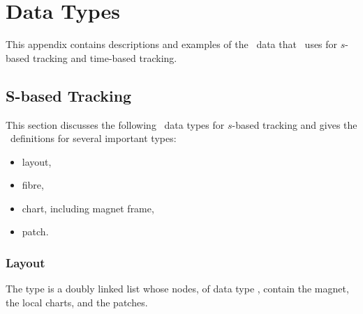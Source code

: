 \makeusother

\chapter{Data Types}

This appendix contains descriptions and examples of the \Fninety\ data that \PTC\ uses for $s$-based tracking and time-based tracking.



\section{S-based Tracking}

This section discusses the following \PTC\ data types for $s$-based tracking
and gives the \Fninety\ definitions for several important types:
\begin{itemize}
  \item layout,
  \item fibre,
  \item chart, including magnet frame,
  \item patch.
\end{itemize}


\subsection{Layout}

The  type is a doubly linked list whose nodes, of data type
, contain the magnet, the local charts, and the patches.

